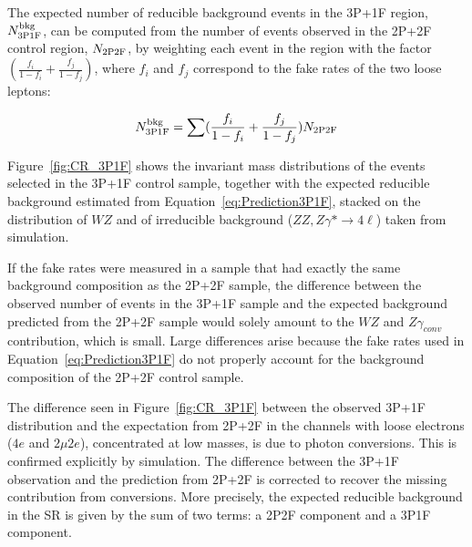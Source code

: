 The expected number of reducible background events in the 3P+1F region,
$N^{\rm bkg}_{\rm 3P1F}$, can be computed from the number of events
observed in the 2P+2F control region, $N_{\rm 2P2F}$, by weighting each
event in the region with the factor $(\frac{f_{i}}{1-f_{i}}
+ \frac{f_{j}}{1-f_{j}})$, where $f_{i}$ and $f_{j}$ correspond to the
fake rates of the two loose leptons:

\begin{equation} 
\label{eq:Prediction3P1F}
N^{\rm bkg}_{\rm 3P1F} = \sum (\frac{f_{i}}{1-f_{i}}
+ \frac{f_{j}}{1-f_{j}}) N_{\rm 2P2F}
\end{equation} 

Figure~\ref{fig:CR_3P1F} shows the invariant mass distributions of the
events selected in the 3P+1F control sample, together with the expected
reducible background estimated from Equation~\ref{eq:Prediction3P1F},
stacked on the distribution
of $WZ$ and of irreducible background ($ZZ, Z\gamma* \to 4\ell$) taken from simulation.

If the fake rates were measured in a sample that had exactly the same
background composition as the 2P+2F sample, the difference between the
observed number of events in the 3P+1F sample and the expected background
predicted from the 2P+2F sample would solely amount to the $WZ$ and $Z\gamma_{conv}$
contribution, which is small. Large differences arise because the fake rates used in
Equation~\ref{eq:Prediction3P1F} do not properly account for the background
composition of the 2P+2F control sample.

The difference seen in Figure~\ref{fig:CR_3P1F} between the observed
3P+1F distribution and the expectation from 2P+2F in the
channels with loose electrons ($4e$ and $2\mu 2e$), concentrated at low
masses, is due to photon conversions. This is confirmed explicitly by simulation.
%
The difference between the 3P+1F observation and the prediction
from 2P+2F is corrected to recover the missing contribution from conversions.
More precisely, the expected reducible background in the SR is given
by the sum of two terms: a 2P2F component and a 3P1F component.

